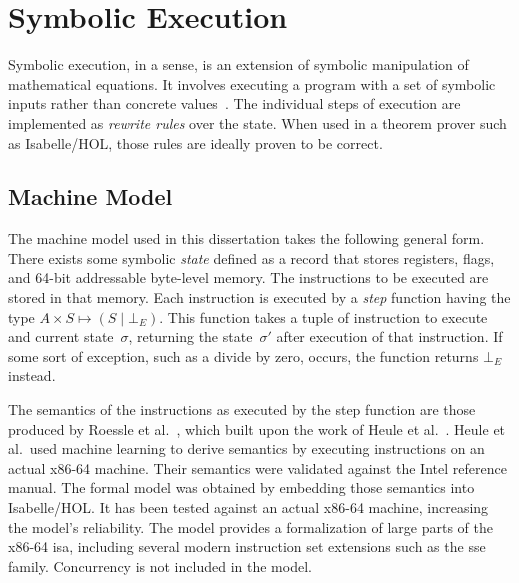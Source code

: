 \chapter{Symbolic Execution}\label{ch:symbolic_execution}
Symbolic execution, in a sense,
is an extension of symbolic manipulation of mathematical equations.
It involves executing a program with a set of symbolic inputs
rather than concrete values~\citep{king1976symbolic}.
The individual steps of execution are implemented as \emph{rewrite rules}
over the state.
When used in a theorem prover such as Isabelle/HOL,
those rules are ideally proven to be correct.


\section{Machine Model}
The machine model used in this dissertation takes the following general form.
There exists some symbolic \emph{state} defined as a record
that stores registers, flags, and 64-bit addressable byte-level memory.
The instructions to be executed are stored in that memory.
Each instruction is executed by a \emph{step} function having the type
$A\times S\mapsto(S\mid\bot_E)$.%
%
%
This function takes a tuple of instruction to execute and current state~$\sigma$,
returning the state~$\sigma'$ after execution of that instruction.
If some sort of exception, such as a divide by zero, occurs,
the function returns $\bot_E$ instead.

The semantics of the instructions as executed by the step function
are those produced by Roessle et al.~\citep{roessle2019},
which built upon the work of Heule et al.~\citep{heule2016}.
Heule et al.\ used machine learning to derive semantics
by executing instructions on an actual x86-64 machine.
Their semantics were validated against the Intel reference manual.
The formal model was obtained by embedding those semantics into Isabelle/HOL.
It has been tested against an actual x86-64 machine, increasing the model's reliability.
The model provides a formalization of large parts of the x86-64 \ac{isa},
including several modern instruction set extensions such as the \ac{sse} family.
Concurrency is not included in the model.

